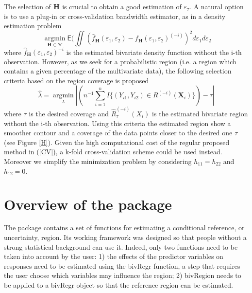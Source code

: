 The selection of $\bf H$ is crucial to obtain a good estimation of $\varepsilon_{\tau}$. A natural option is to use a plug-in or cross-validation bandwidth estimator, as in a density estimation problem
\begin{equation}
\ \underset{\textbf{H} \in \mathcal{H}}{\operatorname{arg\min} } \textsf{E}(\iint \left(\hat{f}_\textbf{H}(\varepsilon_{1},\varepsilon_{2}) - f_\textbf{H}(\varepsilon_{1},\varepsilon_{2})^{(-i)} \right)^2 d\varepsilon_{1}d\varepsilon_{2} 
\label{CV}
\end{equation}
\noindent where $\hat{f}_\textbf{H}(\varepsilon_{1},\varepsilon_{2})^{-i}$ is the estimated bivariate density function without the i-th observation. However, as we seek for a probabilistic region (i.e. a region which contains a given percentage of the multivariate data), the following selection criteria based on the region coverage is proposed
\begin{equation}
\hat{\lambda} = \underset{\lambda}{\operatorname{arg\min} } \left|\left(n^{-1}\sum_{i=1}^n I \{(Y_{i1},Y_{i2})\in R^{(-i)}(\textbf{X}_i)\}\right) - \tau\right|
\label{CV1}
\end{equation}
\noindent where $\tau$ is the desired coverage and $\hat{R}_{\tau}^{(-i)}(X_i)$ is the estimated bivariate region without the i-th observation. Using this criteria the estimated region show a smoother contour and a coverage of the data points closer to the desired one $\tau$ (see Figure \ref{H}). Given the high computational cost of the regular proposed method in (\ref{CV}), a k-fold cross-validation scheme could be used instead. Moreover we simplify the minimization problem by considering $h_{11}=h_{22}$ and $h_{12}=0$.


\section{Overview of the package}

The  package contains a set of functions for estimating a conditional reference, or uncertainty, region. Its working framework was designed so that people without a strong statistical background can use it. Indeed, only two functions need to be taken into account by the user: 1) the effects of the predictor variables on responses need to be estimated using the bivRegr function, a step that requires the user choose which variables may influence the region; 2) bivRegion needs to be applied to a bivRegr object so that the reference region can be estimated. 

